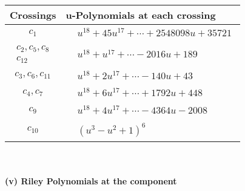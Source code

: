 \documentclass[1p]{elsarticle_modified}
\theoremstyle{definition}
\begin{document}
\begin{tabular}{m{50pt}|m{274pt}}
Crossings & \hspace{64pt}u-Polynomials at each crossing \\
\hline $$\begin{aligned}c_{1}\end{aligned}$$&$\begin{aligned}
&u^{18}+45 u^{17}+\cdots+2548098 u+35721
\end{aligned}$\\
\hline $$\begin{aligned}c_{2},c_{5},c_{8}\\c_{12}\end{aligned}$$&$\begin{aligned}
&u^{18}+u^{17}+\cdots-2016 u+189
\end{aligned}$\\
\hline $$\begin{aligned}c_{3},c_{6},c_{11}\end{aligned}$$&$\begin{aligned}
&u^{18}+2 u^{17}+\cdots-140 u+43
\end{aligned}$\\
\hline $$\begin{aligned}c_{4},c_{7}\end{aligned}$$&$\begin{aligned}
&u^{18}+6 u^{17}+\cdots+1792 u+448
\end{aligned}$\\
\hline $$\begin{aligned}c_{9}\end{aligned}$$&$\begin{aligned}
&u^{18}+4 u^{17}+\cdots-4364 u-2008
\end{aligned}$\\
\hline $$\begin{aligned}c_{10}\end{aligned}$$&$\begin{aligned}
&(u^3- u^2+1)^6
\end{aligned}$\\
\hline
\end{tabular}\\~\\
\newpage\renewcommand{\arraystretch}{1}
\flushleft \textbf{(v) Riley Polynomials at the component}\newline \\
\end{document}
